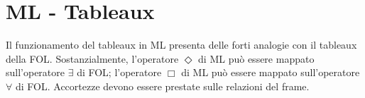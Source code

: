\chapter{ML - Tableaux}

Il funzionamento del tableaux in ML presenta delle forti analogie con il tableaux della FOL. Sostanzialmente, l'operatore $\Diamond$ di ML può essere mappato sull'operatore $\exists$ di FOL; l'operatore $\Box$ di ML può essere mappato sull'operatore $\forall$ di FOL. Accortezze devono essere prestate sulle relazioni del frame.

